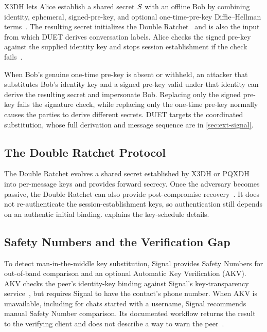 X3DH lets Alice establish a shared secret $S$ with an offline Bob by combining identity,
ephemeral, signed-pre-key, and optional one-time-pre-key Diffie--Hellman terms~\cite[Sections~2.4 and 3.3]{x3dh}.
The resulting secret initializes the Double Ratchet~\cite{doubleratchet} and is also the input from which DUET
derives conversation labels. Alice checks the signed pre-key against the supplied identity key and
stops session establishment if the check fails~\cite[Section~3.3]{x3dh}.

When Bob's genuine one-time pre-key is absent or withheld, an attacker that substitutes Bob's identity
key and a signed pre-key valid under that identity can derive the resulting secret and impersonate
Bob. Replacing only the signed pre-key fails the signature check, while replacing only the one-time
pre-key normally causes the parties to derive different secrets. DUET targets the coordinated
substitution, whose full derivation and message sequence are in \cref{sec:ext-signal}.

\subsection{The Double Ratchet Protocol}\label{ssec:bg-ratchet}

The Double Ratchet evolves a shared secret established by X3DH or PQXDH into per-message
keys and provides forward secrecy. Once the adversary becomes passive, the Double
Ratchet can also provide post-compromise recovery~\cite{doubleratchet,pqxdh}. It does not re-authenticate the
session-establishment keys, so authentication still depends on an authentic initial binding.  explains the key-schedule details.

\subsection{Safety Numbers and the Verification Gap}\label{ssec:bg-gap}

To detect man-in-the-middle key substitution, Signal provides Safety Numbers for out-of-band
comparison and an optional Automatic Key Verification (AKV). AKV checks the peer's
identity-key binding against Signal's key-transparency service~\cite{signal-kt-server}, but requires
Signal to have the contact's phone number. When AKV is unavailable, including for chats started with a username, Signal recommends
manual Safety Number comparison. Its documented workflow returns the result to the verifying
client and does not describe a way to warn the peer~\cite{signal-akv}.

